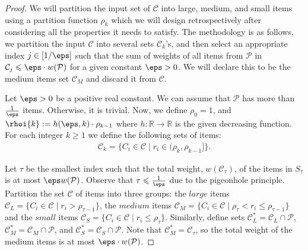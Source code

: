 \begin{proof}
We will partition the input set of $\mathcal{C}$ into large, medium, and small items using a partition function $\rho_k$ which we will design retrospectively after considering all the properties it needs to satisfy. The methodology is as follows, we partition the input $\mathcal{C}$ into several sets \(\mathcal{C}_k\)'s, and then select an appropriate index \(j \in [1/\eps]\) such that the sum of weights of all items from $\mathcal{P}$ in \( \mathcal{C}_j \leqslant \eps\cdot w(\mathcal{P})\) for a given constant $\eps>0$. We will declare this to be the medium items set $\mathcal{C}_M$ and discard it from $\mathcal{C}$.

Let $\eps>0$ be a positive real constant. We can assume that $\mathcal{P}$ has more than $\frac{1}{\eps}$ items. Otherwise, it is trivial.
Now, we define $\rho_0=1$, and $\rhoi{k} := h(\eps, k) \cdot \rho_{k-1}$ where $h: \mathbb{R} \rightarrow \mathbb{R}$ is the given decreasing function. For each integer $k \geqslant 1$ we define the following sets of items:
\begin{align*}
\mathcal{C}_k = \{C_i \in \mathcal{C} \mid r_{i} \in (\rho_{k},\rho_{k-1}]\}.
\end{align*}

Let $\tau$ be the smallest index such that the total weight, $w(\mathcal{C}_{\tau})$, of the items in $S_{\tau}$ is at most $\eps w(\mathcal{P})$. Observe that $\tau \leqslant \frac{1}{\eps}$ due to the pigeonhole principle. Partition the set $\mathcal{C}$ of items into three groups: the $\textit{large}$ items $\mathcal{C}_L = \{C_{i} \in \mathcal{C} \mid r_{i}>\rho_{\tau-1}\}$, the $\textit{medium}$ items $\mathcal{C}_M = \{C_{i} \in \mathcal{C} \mid \rho_{\tau} < r_{i} \leqslant \rho_{\tau-1}\}$ and the $\textit{small}$ items $\mathcal{C}_S = \{C_{i} \in \mathcal{C} \mid r_{i} \leqslant \rho_{\tau}\}$. Similarly, define sets $\mathcal{C}_L^* = \mathcal{C}_L \cap \mathcal{P}$, $\mathcal{C}_M^* = \mathcal{C}_M \cap \mathcal{P}$, and $\mathcal{C}_S^* = \mathcal{C}_S \cap \mathcal{P}$. Note that $\mathcal{C}_M^* = \mathcal{C}_{\tau}$, so the total weight of the medium items is at most $\eps\cdot w(\mathcal{P})$.
\end{proof}


